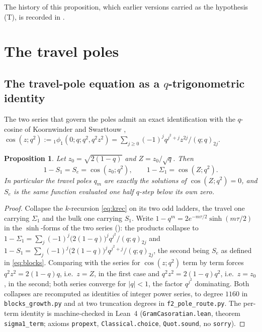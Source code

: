 \documentclass[11pt]{article}
\theoremstyle{plain}
\newtheorem{proposition}[theorem]{Proposition}
\theoremstyle{definition}
\theoremstyle{remark}
\theoremstyle{plain}\newtheorem*{maintheorem}{Main Theorem}
\begin{document}
\noindent The history of this proposition, which earlier versions carried as the hypothesis
\textup{(T)}, is recorded in {\cite[\S\,\textup{sec:inputT}]{Bonfioli2026bB}}.

\section{The travel poles}\label{sec:travelpoles}

\subsection{The travel-pole equation as a $q$-trigonometric identity}\label{sec:qtrig}

The two series that govern the poles admit an exact identification with the $q$-cosine of
Koornwinder and Swarttouw \cite{KS1992}, $\cos(z;q^2):={}_1\phi_1(0;q;q^2,q^2z^2)
=\sum_{j\ge0}(-1)^j q^{j^2+j}z^{2j}/(q;q)_{2j}$.

\begin{proposition}\label{prop:qtrig}
Let $z_0=\sqrt{2(1-q)}$ and $Z=z_0/\sqrt q$. Then
\[
   1-S_1=S_e=\cos(z_0;q^2),\qquad 1-\Sigma_1=\cos(Z;q^2).
\]
In particular the travel poles $q_m$ are exactly the solutions of $\cos(Z;q^2)=0$, and $S_e$ is the
same function evaluated one half $q$-step below its own zero.
\end{proposition}

\begin{proof}
Collapse the $k$-recursion \eqref{eq:krec} on its two odd ladders, the travel one carrying
$\Sigma_1$ and the bulk one carrying $S_1$. Write $1-q^m=2e^{-m\tau/2}\sinh(m\tau/2)$ in the
$\sinh$-forms of the two series
({\cite[\S\,\textup{sec:sd}]{Bonfioli2026bB}}): the products collapse to
$1-\Sigma_1=\sum_j(-1)^j\bigl(2(1-q)\bigr)^jq^{j^2}/(q;q)_{2j}$ and
$1-S_1=\sum_j(-1)^j\bigl(2(1-q)\bigr)^jq^{j^2+j}/(q;q)_{2j}$, the second being $S_e$ as defined in
\eqref{eq:blocks}. Comparing with the series for
$\cos(z;q^2)$ term by term forces $q^2z^2=2(1-q)q$, i.e.\ $z=Z$, in the first case and
$q^2z^2=2(1-q)q^2$, i.e.\ $z=z_0$, in the second; both series converge for $|q|<1$, the factor
$q^{j^2}$ dominating. Both collapses are recomputed as identities of integer power series, to
degree $1160$ in \texttt{blocks\_growth.py} and at two truncation degrees in
\texttt{f2\_pole\_route.py}. The per-term identity is machine-checked in Lean~4
(\texttt{GramCasoratian.lean}, theorem \texttt{sigma1\_term}; axioms \texttt{propext},
\texttt{Classical.choice}, \texttt{Quot.sound}, no \texttt{sorry}).
\end{proof}
\end{document}
